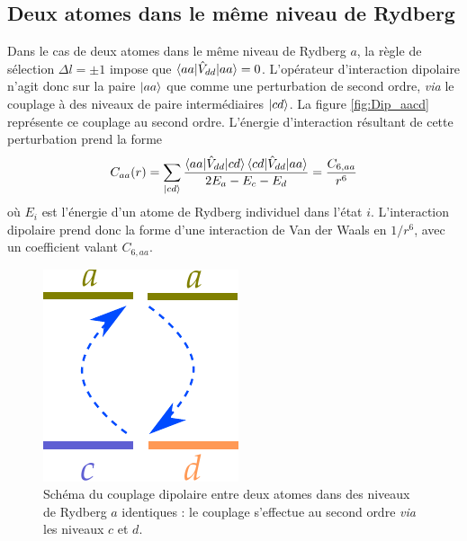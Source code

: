 \subsection{Deux atomes dans le même niveau de Rydberg}
Dans le cas de deux atomes dans le même niveau de Rydberg $a$, la règle de sélection $\Delta l = \pm 1$ impose que $\braket{aa|\hat{V}_{dd}|aa} = 0$.
L'opérateur d'interaction dipolaire n'agit donc sur la paire $\ket{aa}$ que comme une perturbation de second ordre, \textit{via} le couplage à des niveaux de paire intermédiaires $\ket{cd}$.
La figure \eqref{fig:Dip_aacd} représente ce couplage au second ordre.
L'énergie d'interaction résultant de cette perturbation prend la forme
\begin{equation}\label{eq:VdW_aacd}
C_{aa}(r)=\sum_{\ket{cd}}{\frac{\braket{aa|\hat{V}_{dd}|cd}\braket{cd|\hat{V}_{dd}|aa}}{2E_a - E_c - E_d}}  = \frac{C_{6,aa}}{r^6}
\end{equation}
où $E_i$ est l'énergie d'un atome de Rydberg individuel dans l'état $i$.
L'interaction dipolaire prend donc la forme d'une interaction de Van der Waals en $1/r^6$, avec un coefficient valant $C_{6,aa}$.

\begin{figure}[!h]
\centering

\includegraphics[width=0.3\linewidth]{figures/dipole_coupling_aacd}
\caption[Couplage dipolaire entre mêmes niveaux de Rydberg]{Schéma du couplage dipolaire entre deux atomes dans des niveaux de Rydberg $a$ identiques : le couplage s'effectue au second ordre \textit{via} les niveaux $c$ et $d$.}
\label{fig:Dip_aacd}
\end{figure}

